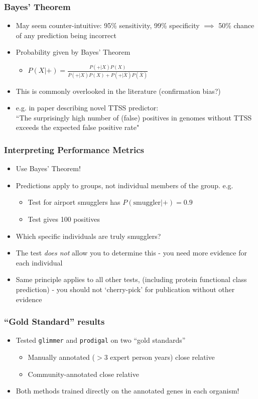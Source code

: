 \begin{frame}
  \frametitle{Bayes' Theorem}
  \begin{itemize}
    \item May seem counter-intuitive: 95\% sensitivity, 99\% specificity $\implies$ 50\% chance of any prediction being incorrect
    \item Probability given by Bayes' Theorem
    \begin{itemize}
      \item $P(X|+) =  \frac{P(+|X) P(X)}{P(+|X) P(X) + P(+|\bar{X}) P(\bar{X})}$
    \end{itemize}
    \item This is commonly overlooked in the literature (confirmation bias?)
    \item e.g. in paper describing novel TTSS predictor: \\
      ``The surprisingly high number of (false) positives in genomes without TTSS exceeds the expected false positive rate"
  \end{itemize} 
\end{frame}

\begin{frame}
  \frametitle{Interpreting Performance Metrics}
  \begin{itemize}
    \item<1-> Use Bayes' Theorem!
    \item<1-> Predictions apply to groups, not individual members of the group. e.g.
    \begin{itemize}
      \item Test for airport smugglers has $P(\text{smuggler}|+) = 0.9$
      \item Test gives 100 positives
    \end{itemize}
    \item<1-> Which specific individuals are truly smugglers?
    \item<2-> The test \emph{does not} allow you to determine this - you need more evidence for each individual
    \item<2->  Same principle applies to all other tests, (including protein functional class prediction) - you should not `cherry-pick' for publication without other evidence
  \end{itemize} 
\end{frame}

\begin{frame}
  \frametitle{``Gold Standard'' results}
  \begin{itemize}
    \item Tested \texttt{glimmer} and \texttt{prodigal} on two ``gold standards''
    \begin{itemize}
      \item Manually annotated ($>$3 expert person years) close relative
      \item Community-annotated close relative
    \end{itemize}
    \item Both methods trained directly on the annotated genes in each organism!
  \end{itemize} 
\end{frame}

